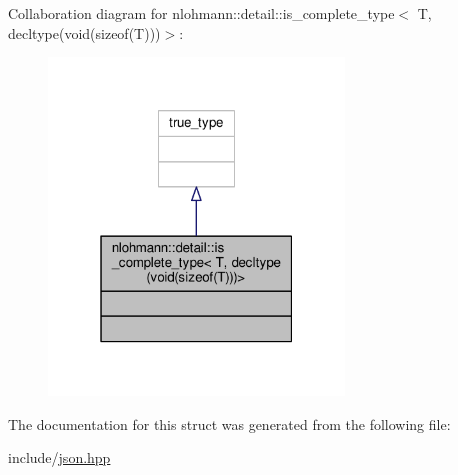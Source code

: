 Collaboration diagram for nlohmann\+:\+:detail\+:\+:is\+\_\+complete\+\_\+type$<$ T, decltype(void(sizeof(T)))$>$\+:
\nopagebreak
\begin{figure}[H]
\begin{center}
\leavevmode
\includegraphics[width=223pt]{structnlohmann_1_1detail_1_1is__complete__type_3_01T_00_01decltype_07void_07sizeof_07T_08_08_08_4__coll__graph}
\end{center}
\end{figure}


The documentation for this struct was generated from the following file\+:\begin{DoxyCompactItemize}
\item 
include/\hyperlink{json_8hpp}{json.\+hpp}\end{DoxyCompactItemize}
